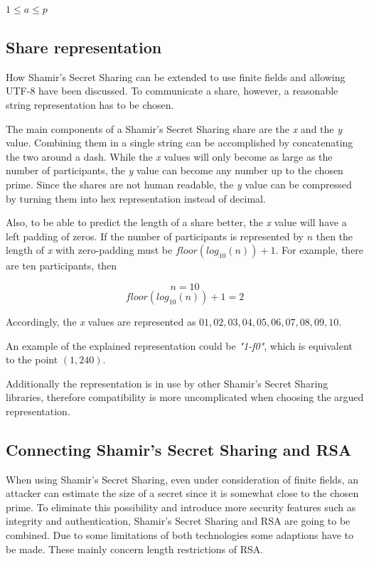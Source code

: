 $1 \leq a \leq p$

\subsection{Share representation}

How Shamir's Secret Sharing can be extended to use finite fields and allowing
UTF-8 have been discussed. To communicate a share, however, a reasonable string
representation has to be chosen.

The main components of a Shamir's Secret Sharing share are the \textit{x} and
the \textit{y} value. Combining them in a single string can be accomplished by
concatenating the two around a dash. While the \textit{x} values will only
become as large as the number of participants, the \textit{y} value can become
any number up to the chosen prime. Since the shares are not human readable,
the \textit{y} value can be compressed by turning them into hex representation
instead of decimal.

Also, to be able to predict the length of a share better, the \textit{x} value
will have a left padding of zeros. If the number of participants is represented
by $n$ then the length of \textit{x} with zero-padding must be
$floor(log_{10}(n))+1$. For example, there are ten participants, then

$$n = 10$$
$$floor(log_{10}(n))+1 = 2$$

Accordingly, the \textit{x} values are represented as $01, 02, 03, 04, 05, 06,
07, 08, 09, 10$.

An example of the explained representation could be \textit{"1-f0"}, which is
equivalent to the point $(1, 240)$.

Additionally the representation is in use by other Shamir's Secret Sharing
libraries, therefore compatibility is more uncomplicated when choosing the
argued representation.

\subsection{Connecting Shamir's Secret Sharing and RSA}

When using Shamir's Secret Sharing, even under consideration of finite fields,
an attacker can estimate the size of a secret since it is somewhat close to the
chosen prime. To eliminate this possibility and introduce more security
features such as integrity and authentication, Shamir's Secret Sharing and RSA
are going to be combined. Due to some limitations of both technologies some
adaptions have to be made. These mainly concern length restrictions of RSA.

